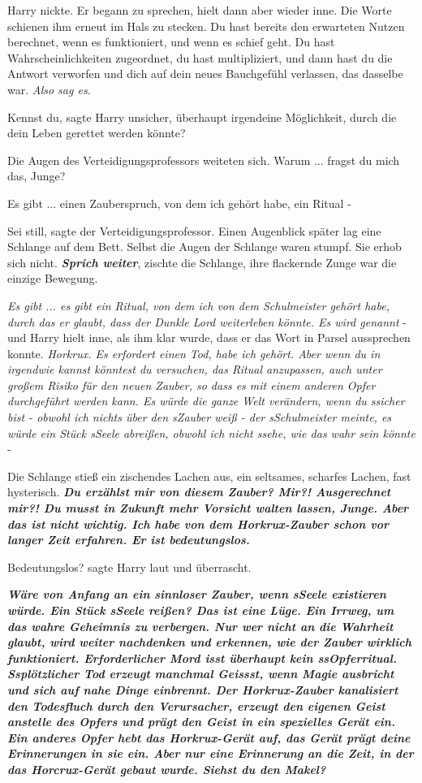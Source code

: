 Harry nickte. Er begann zu sprechen, hielt dann aber wieder inne. Die Worte
schienen ihm erneut im Hals zu stecken. Du hast bereits den erwarteten Nutzen
berechnet, wenn es funktioniert, und wenn es schief geht. Du hast
Wahrscheinlichkeiten zugeordnet, du hast multipliziert, und dann hast du die
Antwort verworfen und dich auf dein neues Bauchgefühl verlassen, das dasselbe
war.
\emph{Also sag es.}

\glqq{}Kennst du\grqq{}, sagte Harry unsicher, \glqq{}überhaupt irgendeine
Möglichkeit, durch die dein Leben gerettet werden könnte?\grqq{}

Die Augen des Verteidigungsprofessors weiteten sich. \glqq{}Warum ... fragst du
mich das, Junge?\grqq{}

\glqq{}Es gibt ... einen Zauberspruch, von dem ich gehört habe, ein Ritual -\grqq{}

\glqq{}Sei still\grqq{}, sagte der Verteidigungsprofessor. Einen Augenblick
später lag eine Schlange auf dem Bett. Selbst die Augen der Schlange waren
stumpf. Sie erhob sich nicht. \glqq{}\textbf{\emph{Sprich weiter}}\grqq{},
zischte die Schlange, ihre flackernde Zunge war die einzige Bewegung.

\glqq{}\emph{Es gibt ... es gibt ein Ritual, von dem ich von dem Schulmeister
gehört habe, durch das er glaubt, dass der Dunkle Lord weiterleben könnte. Es
wird genannt} -\grqq{} und Harry hielt inne, als ihm klar wurde, dass er das
Wort in Parsel aussprechen konnte. \glqq{}\emph{Horkrux. Es erfordert einen Tod,
habe ich gehört. Aber wenn du in irgendwie kannst könntest du versuchen, das
Ritual anzupassen, auch unter großem Risiko für den neuen Zauber, so dass es mit
einem anderen Opfer durchgeführt werden kann. Es würde die ganze Welt verändern,
wenn du ssicher bist - obwohl ich nichts über den sZauber weiß - der
sSchulmeister meinte, es würde ein Stück sSeele abreißen, obwohl ich nicht
ssehe, wie das wahr sein könnte} -\grqq{}

Die Schlange stieß ein zischendes Lachen aus, ein seltsames, scharfes Lachen,
fast hysterisch. \glqq{}\textbf{\emph{Du erzählst mir von diesem Zauber? Mir?!
Ausgerechnet mir?! Du musst in Zukunft mehr Vorsicht walten lassen, Junge. Aber
das ist nicht wichtig. Ich habe von dem Horkrux-Zauber schon vor langer Zeit
erfahren. Er ist bedeutungslos.\grqq{}} }

\glqq{}Bedeutungslos?\grqq{} sagte Harry laut und überrascht.

\glqq{}\textbf{\emph{Wäre von Anfang an ein sinnloser Zauber, wenn sSeele
existieren würde. Ein Stück sSeele reißen? Das ist eine Lüge. Ein Irrweg, um das
wahre Geheimnis zu verbergen. Nur wer nicht an die Wahrheit glaubt, wird weiter
nachdenken und erkennen, wie der Zauber wirklich funktioniert. Erforderlicher
Mord isst überhaupt kein ssOpferritual. Ssplötzlicher Tod erzeugt manchmal
Geissst, wenn Magie ausbricht und sich auf nahe Dinge einbrennt. Der
Horkrux-Zauber kanalisiert den Todesfluch durch den Verursacher, erzeugt den
eigenen Geist anstelle des Opfers und prägt den Geist in ein spezielles Gerät
ein. Ein anderes Opfer hebt das Horkrux-Gerät auf, das Gerät prägt deine
Erinnerungen in sie ein. Aber nur eine Erinnerung an die Zeit, in der das
Horcrux-Gerät gebaut wurde. Siehst du den Makel?}}\grqq{}

